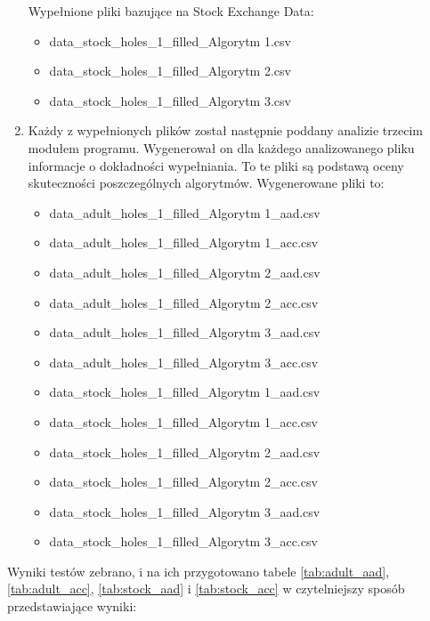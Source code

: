 \documentclass[12pt,twoside]{article}
\begin{document}
\begin{enumerate}[label=\arabic*), leftmargin=1.25cm]
          Wypełnione pliki bazujące na Stock Exchange Data:
          \begin{itemize}[label=-,labelsep=0.4cm, leftmargin=1.25cm]
              \item data\_stock\_holes\_1\_filled\_Algorytm 1.csv
              \item data\_stock\_holes\_1\_filled\_Algorytm 2.csv
              \item data\_stock\_holes\_1\_filled\_Algorytm 3.csv
          \end{itemize}
    \item Każdy z wypełnionych plików został następnie poddany analizie trzecim modułem programu.
          Wygenerował on dla każdego analizowanego pliku informacje o dokładności wypełniania.
          To te pliki są podstawą oceny skuteczności poszczególnych algorytmów.
          Wygenerowane pliki to:
          \begin{itemize}[label=-,labelsep=0.4cm, leftmargin=1.25cm]
              \item data\_adult\_holes\_1\_filled\_Algorytm 1\_aad.csv
              \item data\_adult\_holes\_1\_filled\_Algorytm 1\_acc.csv
              \item data\_adult\_holes\_1\_filled\_Algorytm 2\_aad.csv
              \item data\_adult\_holes\_1\_filled\_Algorytm 2\_acc.csv
              \item data\_adult\_holes\_1\_filled\_Algorytm 3\_aad.csv
              \item data\_adult\_holes\_1\_filled\_Algorytm 3\_acc.csv
              \item data\_stock\_holes\_1\_filled\_Algorytm 1\_aad.csv
              \item data\_stock\_holes\_1\_filled\_Algorytm 1\_acc.csv
              \item data\_stock\_holes\_1\_filled\_Algorytm 2\_aad.csv
              \item data\_stock\_holes\_1\_filled\_Algorytm 2\_acc.csv
              \item data\_stock\_holes\_1\_filled\_Algorytm 3\_aad.csv
              \item data\_stock\_holes\_1\_filled\_Algorytm 3\_acc.csv
          \end{itemize}
\end{enumerate}

Wyniki testów zebrano, i na ich przygotowano tabele \ref{tab:adult_aad}, \ref{tab:adult_acc}, \ref{tab:stock_aad} i \ref{tab:stock_acc} w czytelniejszy sposób przedstawiające wyniki:
\end{document}

